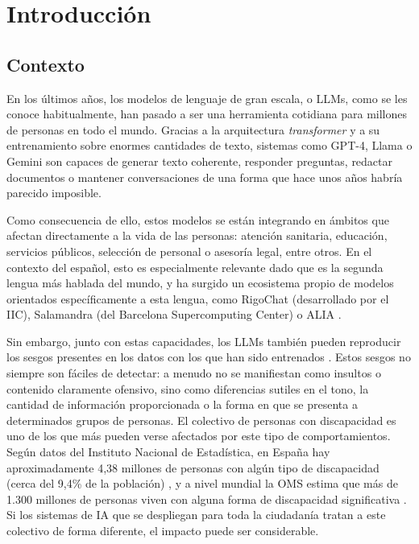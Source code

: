 \documentclass[12pt]{report} %
\renewcommand{\_}{\oldunderscore\allowbreak}
\begin{document}
\chapter{Introducción}

\section{Contexto}
En los últimos años, los modelos de lenguaje de gran escala, o LLMs, como se les conoce habitualmente, han pasado a ser una herramienta cotidiana para millones de personas en todo el mundo. Gracias a la arquitectura \textit{transformer} \cite{vaswani2017attention} y a su entrenamiento sobre enormes cantidades de texto, sistemas como GPT-4, Llama o Gemini son capaces de generar texto coherente, responder preguntas, redactar documentos o mantener conversaciones de una forma que hace unos años habría parecido imposible.

Como consecuencia de ello, estos modelos se están integrando en ámbitos que afectan directamente a la vida de las personas: atención sanitaria, educación, servicios públicos, selección de personal o asesoría legal, entre otros. En el contexto del español, esto es especialmente relevante dado que es la segunda lengua más hablada del mundo, y ha surgido un ecosistema propio de modelos orientados específicamente a esta lengua, como RigoChat \cite{rigochat} (desarrollado por el IIC), Salamandra \cite{salamandra} (del Barcelona Supercomputing Center) o ALIA \cite{alia2025}.


Sin embargo, junto con estas capacidades, los LLMs también pueden reproducir los sesgos presentes en los datos con los que han sido entrenados \cite{navigli2023biases, guo2024bias}. Estos sesgos no siempre son fáciles de detectar: a menudo no se manifiestan como insultos o contenido claramente ofensivo, sino como diferencias sutiles en el tono, la cantidad de información proporcionada o la forma en que se presenta a determinados grupos de personas. El colectivo de personas con discapacidad es uno de los que más pueden verse afectados por este tipo de comportamientos. Según datos del Instituto Nacional de Estadística, en España hay aproximadamente 4,38 millones de personas con algún tipo de discapacidad (cerca del 9,4\% de la población) \cite{ine2022edad}, y a nivel mundial la OMS estima que más de 1.300 millones de personas viven con alguna forma de discapacidad significativa \cite{who2023disability}. Si los sistemas de IA que se despliegan para toda la ciudadanía tratan a este colectivo de forma diferente, el impacto puede ser considerable. 
\end{document}
